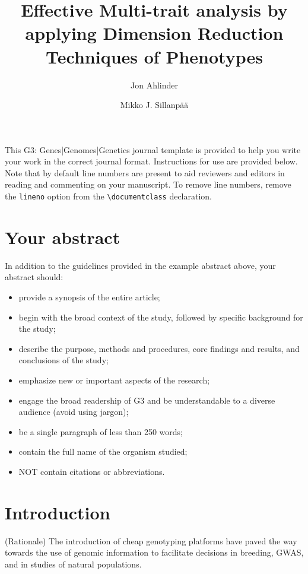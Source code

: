 \documentclass[9pt,twocolumn,twoside,lineno]{gsag3jnl}
\title{Effective Multi-trait analysis by applying Dimension Reduction Techniques of Phenotypes}
\author[$\ast$,1]{Jon Ahlinder}
\author[2]{Mikko J. Sillanp{\"a}{\"a}}
\affil[1]{Skogforsk, S{\"a}var, SE-91821, Sweden.}
\affil[2]{Research Unit of Mathematical Sciences, Oulu University, Oulu, FI-90014, Finland.}
\begin{document}
\maketitle
\thispagestyle{firststyle}
\firstpagefootnote
\vspace{-13pt}%

\noindent This G3: Genes|Genomes|Genetics journal template is provided to help you write your work in the correct journal format. Instructions for use are provided below. Note that by default line numbers are present to aid reviewers and editors in reading and commenting on your manuscript. To remove line numbers, remove the \texttt{lineno} option from the \verb|\documentclass| declaration.


\section{Your abstract}

In addition to the guidelines provided in the example abstract above, your abstract should:

\begin{itemize}
\item provide a synopsis of the entire article;
\item begin with the broad context of the study, followed by specific background for the study;
\item describe the purpose, methods and procedures, core findings and results, and conclusions of the study;
\item emphasize new or important aspects of the research;
\item engage the broad readership of G3 and be understandable to a diverse audience (avoid using jargon);
\item be a single paragraph of less than 250 words;
\item contain the full name of the organism studied;
\item NOT contain citations or abbreviations.
\end{itemize}

\section{Introduction}

(Rationale) The introduction of cheap genotyping platforms have paved the way towards the use of genomic information to facilitate decisions in breeding, GWAS, and in studies of natural populations. 
\end{document}

